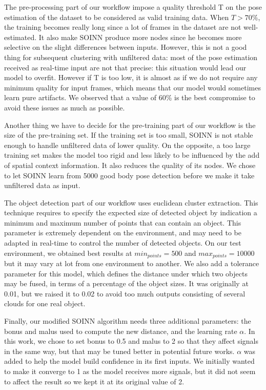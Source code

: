 The pre-processing part of our workflow impose a quality threshold T on the pose estimation of the dataset to be considered as valid training data. When $T > 70\%$, the training becomes really long since a lot of frames in the dataset are not well-estimated. It also make SOINN produce more nodes since he becomes more selective on the slight differences between inputs. However, this is not a good thing for subsequent clustering with unfiltered data: most of the pose estimation received as real-time input are not that precise: this situation would lead our model to overfit.
However if T is too low, it is almost as if we do not require any minimum quality for input frames, which means that our model would sometimes learn pure artifacts. We observed that a value of 60\% is the best compromise to avoid these issues as much as possible.

Another thing we have to decide for the pre-training part of our workflow is the size of the pre-training set. If the training set is too small, SOINN is not stable enough to handle unfiltered data of lower quality. On the opposite, a too large training set makes the model too rigid and less likely to be influenced by the add of spatial context information. It also reduces the quality of its nodes. We chose to let SOINN learn from 5000 good body pose detection before we make it take unfiltered data as input.

The object detection part of our workflow uses euclidean cluster extraction. This technique requires to specify the expected size of detected object by indication a minimum and maximum number of points that can contain an object. This parameter is extremely dependent on the environment, and may need to be adapted in real-time to control the number of detected objects. On our test environment, we obtained best results at $min_{points}=500$ and $max_{points}=10000$ but it may vary at lot from one environment to another. We also add a tolerance parameter for this model, which defines the distance under which two objects may be fused, in terms of a percentage of the object sizes. It was originally at 0.01, but we raised it to 0.02 to avoid too much outputs consisting of several clouds for one real object.

Finally, our modified SOINN algorithm needs three additional parameters: the bonus and malus used to compute the new distance, and the learning rate $\alpha$. In this work, we chose to set bonus to 0.5 and malus to 2 so that they affect signals in the same way, but that may be tuned better in potential future works. $\alpha$ was added to help the model build confidence in its first inputs. We initially wanted to make it converge to 1 as the model receives more signals, but it did not seem to affect the result so we kept it at its original value of 2.

